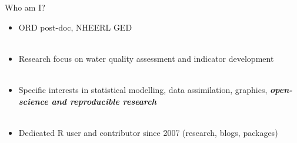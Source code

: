 \documentclass[serif]{beamer}\usepackage[]{graphicx}\usepackage[]{color}
\newcommand{\emtxt}[1]{\textbf{\textit{#1}}}
\begin{document}
\begin{frame}{Who am I?}
\begin{itemize}
\item ORD post-doc, NHEERL GED \\~\\
\item Research focus on water quality assessment and indicator development \\~\\
\item Specific interests in statistical modelling, data assimilation, graphics, \emtxt{open-science and reproducible research}\\~\\
\item Dedicated R user and contributor since 2007 (research, blogs, packages)
\end{itemize}
\end{frame}
\end{document}

